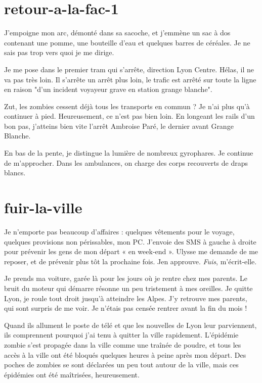 \section{retour-a-la-fac-1}

J'empoigne mon arc, démonté dans sa sacoche, et j'emmène un sac à dos contenant une pomme, une bouteille d'eau et quelques barres de céréales. Je ne sais pas trop vers quoi je me dirige.

Je me pose dans le premier tram qui s'arrête, direction Lyon Centre. Hélas, il ne va pas très loin. Il s'arrête un arrêt plus loin, le trafic est arrêté sur toute la ligne en raison "d'un incident voyayeur grave en station grange blanche".

Zut, les zombies cessent déjà tous les transports en commun ? Je n'ai plus qu'à continuer à pied. Heureusement, ce n'est pas bien loin. En longeant les rails d'un bon pas, j'atteins bien vite l'arrêt Ambroise Paré, le dernier avant Grange Blanche.

En bas de la pente, je distingue la lumière de nombreux gyrophares. Je continue de m'approcher. Dans les ambulances, on charge des corps recouverts de draps blancs.
 

\section{fuir-la-ville}

Je n'emporte pas beaucoup d'affaires : quelques vêtements pour le voyage, quelques provisions non périssables, mon PC. J'envoie des SMS à gauche à droite pour prévenir les gens de mon départ « en week-end ». Ulysse me demande de me reposer, et de prévenir plus tôt la prochaine fois. Jen approuve. \textit{Fuis}, m'écrit-elle.

Je prends ma voiture, garée là pour les jours où je rentre chez mes parents. Le bruit du moteur qui démarre résonne un peu tristement à mes oreilles. Je quitte Lyon, je roule tout droit jusqu'à atteindre les Alpes. J'y retrouve mes parents, qui sont surpris de me voir. Je n'étais pas censée rentrer avant la fin du mois !

Quand ils allument le poste de télé et que les nouvelles de Lyon leur parviennent, ils comprennent pourquoi j'ai tenu à quitter la ville rapidement. L'épidémie zombie s'est propagée dans la ville comme une traînée de poudre, et tous les accès à la ville ont été bloqués quelques heures à peine après mon départ. Des poches de zombies se sont déclarées un peu tout autour de la ville, mais ces épidémies ont été maîtrisées, heureusement.

